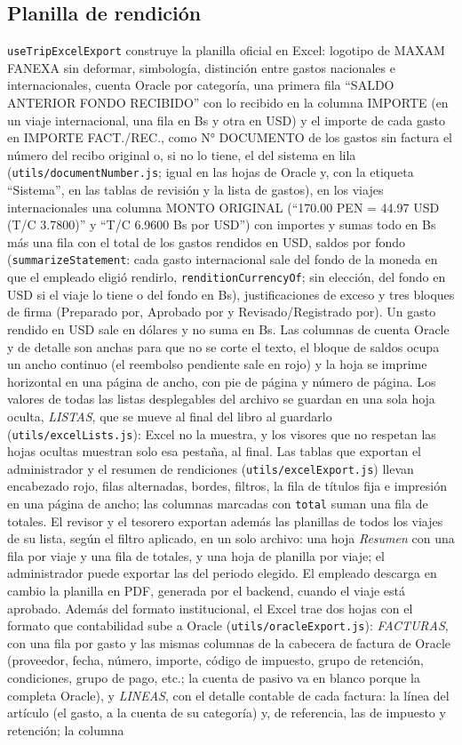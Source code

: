 \documentclass[11pt,letterpaper]{article}
\newcommand{\code}[1]{\nolinkurl{#1}}
\begin{document}
\subsection{Planilla de rendición}
\code{useTripExcelExport} construye la planilla oficial en Excel: logotipo de MAXAM FANEXA sin deformar, simbología, distinción entre gastos nacionales e internacionales, cuenta Oracle por categoría, una primera fila ``SALDO ANTERIOR FONDO RECIBIDO'' con lo recibido en la columna IMPORTE (en un viaje internacional, una fila en Bs y otra en USD) y el importe de cada gasto en IMPORTE FACT./REC., como N° DOCUMENTO de los gastos sin factura el número del recibo original o, si no lo tiene, el del sistema en lila (\code{utils/documentNumber.js}; igual en las hojas de Oracle y, con la etiqueta ``Sistema'', en las tablas de revisión y la lista de gastos), en los viajes internacionales una columna MONTO ORIGINAL (``170.00 PEN = 44.97 USD (T/C 3.7800)'' y ``T/C 6.9600 Bs por USD'') con importes y sumas todo en Bs más una fila con el total de los gastos rendidos en USD, saldos por fondo (\code{summarizeStatement}: cada gasto internacional sale del fondo de la moneda en que el empleado eligió rendirlo, \code{renditionCurrencyOf}; sin elección, del fondo en USD si el viaje lo tiene o del fondo en Bs), justificaciones de exceso y tres bloques de firma (Preparado por, Aprobado por y Revisado/Registrado por). Un gasto rendido en USD sale en dólares y no suma en Bs. Las columnas de cuenta Oracle y de detalle son anchas para que no se corte el texto, el bloque de saldos ocupa un ancho continuo (el reembolso pendiente sale en rojo) y la hoja se imprime horizontal en una página de ancho, con pie de página y número de página. Los valores de todas las listas desplegables del archivo se guardan en una sola hoja oculta, \emph{LISTAS}, que se mueve al final del libro al guardarlo (\code{utils/excelLists.js}): Excel no la muestra, y los visores que no respetan las hojas ocultas muestran solo esa pestaña, al final. Las tablas que exportan el administrador y el resumen de rendiciones (\code{utils/excelExport.js}) llevan encabezado rojo, filas alternadas, bordes, filtros, la fila de títulos fija e impresión en una página de ancho; las columnas marcadas con \code{total} suman una fila de totales. El revisor y el tesorero exportan además las planillas de todos los viajes de su lista, según el filtro aplicado, en un solo archivo: una hoja \emph{Resumen} con una fila por viaje y una fila de totales, y una hoja de planilla por viaje; el administrador puede exportar las del periodo elegido. El empleado descarga en cambio la planilla en PDF, generada por el backend, cuando el viaje está aprobado. Además del formato institucional, el Excel trae dos hojas con el formato que contabilidad sube a Oracle (\code{utils/oracleExport.js}): \emph{FACTURAS}, con una fila por gasto y las mismas columnas de la cabecera de factura de Oracle (proveedor, fecha, número, importe, código de impuesto, grupo de retención, condiciones, grupo de pago, etc.; la cuenta de pasivo va en blanco porque la completa Oracle), y \emph{LINEAS}, con el detalle contable de cada factura: la línea del artículo (el gasto, a la cuenta de su categoría) y, de referencia, las de impuesto y retención; la columna 
\end{document}
